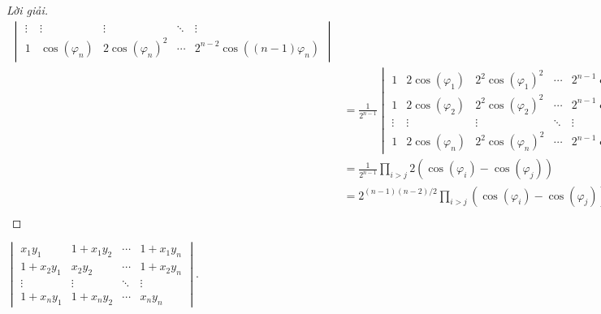 \documentclass[class=nhvh-linear-algebra,crop=false]{standalone}
\begin{document}
\begin{proof}[Lời giải]
\begin{align*}
\begin{vmatrix}
            \vdots & \vdots            & \vdots                   & \ddots & \vdots                        \\
            1      & \cos(\varphi_{n}) & 2{\cos(\varphi_{n})}^{2} & \cdots & 2^{n-2}\cos((n-1)\varphi_{n})
        \end{vmatrix}              \\
         & = \frac{1}{2^{n-1}}
        \begin{vmatrix}
            1      & 2\cos(\varphi_{1}) & 2^{2}{\cos(\varphi_{1})}^{2} & \cdots & 2^{n-1}{\cos(\varphi_{1})}^{n-1} \\
            1      & 2\cos(\varphi_{2}) & 2^{2}{\cos(\varphi_{2})}^{2} & \cdots & 2^{n-1}{\cos(\varphi_{2})}^{n-2} \\
            \vdots & \vdots             & \vdots                       & \ddots & \vdots                           \\
            1      & 2\cos(\varphi_{n}) & 2^{2}{\cos(\varphi_{n})}^{2} & \cdots & 2^{n-1}{\cos(\varphi_{n})}^{n-1}
        \end{vmatrix} \\
         & = \frac{1}{2^{n-1}}\prod_{i>j}2(\cos(\varphi_{i}) - \cos(\varphi_{j}))                                        \\
         & = 2^{(n-1)(n-2)/2}\prod_{i>j}(\cos(\varphi_{i}) - \cos(\varphi_{j})).                                         \\
    \end{align*}
    \endgroup{}
\end{proof}

\begin{exercise}
    $\begin{vmatrix}
            x_{1}y_{1}     & 1 + x_{1}y_{2} & \cdots & 1 + x_{1}y_{n} \\
            1 + x_{2}y_{1} & x_{2}y_{2}     & \cdots & 1 + x_{2}y_{n} \\
            \vdots         & \vdots         & \ddots & \vdots         \\
            1 + x_{n}y_{1} & 1 + x_{n}y_{2} & \cdots & x_{n}y_{n}
        \end{vmatrix}$.
\end{exercise}
\end{document}
